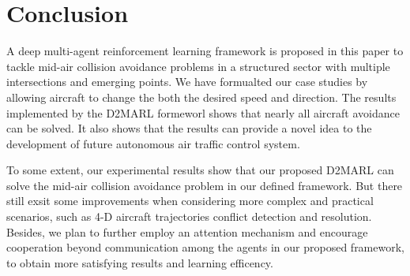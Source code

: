 \section{Conclusion}
A deep multi-agent reinforcement learning framework is proposed in this paper to tackle mid-air collision avoidance problems in a structured sector with multiple intersections and emerging points. We have formualted our case studies by allowing aircraft to change the both the desired speed and direction. The results implemented by the D2MARL formeworl shows that nearly all aircraft avoidance can be solved. It also shows that the results can provide a novel idea to the development of future autonomous air traffic control system.

To some extent, our experimental results show that our proposed D2MARL can solve the mid-air collision avoidance problem in our defined framework. But there still exsit some improvements when considering more complex and practical scenarios, such as 4-D aircraft trajectories conflict detection and resolution. Besides, we plan to further employ an attention mechanism and encourage cooperation beyond communication among the agents in our proposed framework, to obtain more satisfying results and learning efficency.

